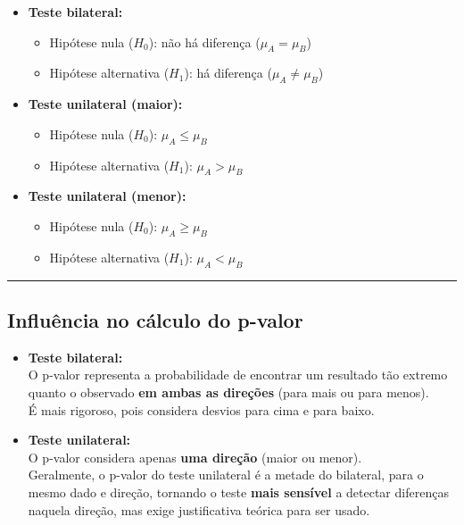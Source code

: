 \documentclass[
]{book}
\providecommand{\tightlist}{%
  \setlength{\itemsep}{0pt}\setlength{\parskip}{0pt}}
\begin{document}
\begin{itemize}
\tightlist
\item
  \textbf{Teste bilateral:}

  \begin{itemize}
  \tightlist
  \item
    Hipótese nula (\(H_0\)): não há diferença (\(\mu_A = \mu_B\))
  \item
    Hipótese alternativa (\(H_1\)): há diferença (\(\mu_A \neq \mu_B\))
  \end{itemize}
\item
  \textbf{Teste unilateral (maior):}

  \begin{itemize}
  \tightlist
  \item
    Hipótese nula (\(H_0\)): \(\mu_A \leq \mu_B\)
  \item
    Hipótese alternativa (\(H_1\)): \(\mu_A > \mu_B\)
  \end{itemize}
\item
  \textbf{Teste unilateral (menor):}

  \begin{itemize}
  \tightlist
  \item
    Hipótese nula (\(H_0\)): \(\mu_A \geq \mu_B\)
  \item
    Hipótese alternativa (\(H_1\)): \(\mu_A < \mu_B\)
  \end{itemize}
\end{itemize}

\begin{center}\rule{0.5\linewidth}{0.5pt}\end{center}

\subsection{Influência no cálculo do p-valor}\label{influuxeancia-no-cuxe1lculo-do-p-valor}

\begin{itemize}
\item
  \textbf{Teste bilateral:}\\
  O p-valor representa a probabilidade de encontrar um resultado tão extremo quanto o observado \textbf{em ambas as direções} (para mais ou para menos).\\
  É mais rigoroso, pois considera desvios para cima e para baixo.
\item
  \textbf{Teste unilateral:}\\
  O p-valor considera apenas \textbf{uma direção} (maior ou menor).\\
  Geralmente, o p-valor do teste unilateral é a metade do bilateral, para o mesmo dado e direção, tornando o teste \textbf{mais sensível} a detectar diferenças naquela direção, mas exige justificativa teórica para ser usado.
\end{itemize}
\end{document}
